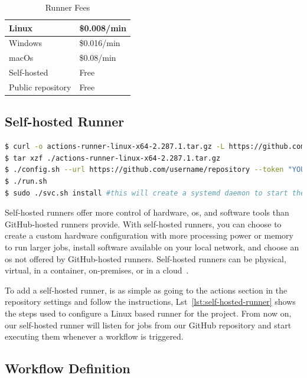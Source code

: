 \begin{table}[h]
\centering
\caption{Runner Fees}
\label{tab:action-fees}
\begin{tabular}{@{}ll@{}}
\toprule
Linux             & \$0.008/min \\ \midrule
Windows           & \$0.016/min \\ \midrule
macOs             & \$0.08/min  \\ \midrule
Self-hosted       & Free        \\ \midrule
Public repository & Free       
\end{tabular}
\end{table}

\subsection{Self-hosted Runner}

\begin{lstlisting}[language=bash, caption=Set up Self-hosted Runner,label={lst:self-hosted-runner}]
$ curl -o actions-runner-linux-x64-2.287.1.tar.gz -L https://github.com/actions/runner/releases/download/v2.287.1/actions-runner-linux-x64-2.287.1.tar.gz
$ tar xzf ./actions-runner-linux-x64-2.287.1.tar.gz
$ ./config.sh --url https://github.com/username/repository --token "YOUR TOKEN"
$ ./run.sh
$ sudo ./svc.sh install #this will create a systemd daemon to start the runner on start up
\end{lstlisting}

Self-hosted runners offer more control of hardware, \gls{os}, and software tools than GitHub-hosted runners provide. With self-hosted runners, you can choose to create a custom hardware configuration with more processing power or memory to run larger jobs, install software available on your local network, and choose an \gls{os} not offered by GitHub-hosted runners. Self-hosted runners can be physical, virtual, in a container, on-premises, or in a cloud~\cite{selfHostedRunner}.

To add a self-hosted runner, is as simple as going to the actions section in the repository settings and follow the instructions, Lst~\ref{lst:self-hosted-runner} shows the steps used to configure a Linux based runner for the project. From now on, our self-hosted runner will listen for jobs from our GitHub repository and start executing them whenever a workflow is triggered.

\subsection{Workflow Definition}

